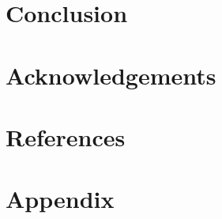 \documentclass[journal, onecolumn]{IEEEtran}
\begin{document}
	
	\section{Conclusion}



	\section{Acknowledgements}
	
	
	
	\section{References}
	
	
	
	\section*{Appendix}
	
	
	
\end{document}
